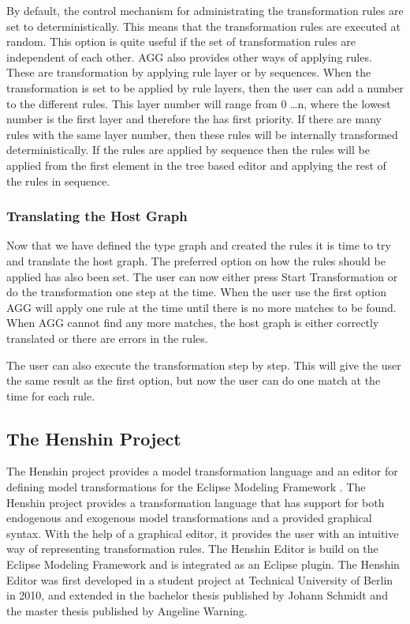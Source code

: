 By default, the control mechanism for administrating the transformation rules
are set to deterministically. This means that the transformation rules are
executed at random. This option is quite useful if the set of transformation
rules are independent of each other. AGG also provides other ways of applying
rules. These are transformation by applying rule layer or by sequences. When the
transformation is set to be applied by rule layers, then the user can add a
number to the different rules. This layer number will range from 0 \ldots n,
where the lowest number is the first layer and therefore the has first
priority. If there are many rules with the same layer number, then these rules
will be internally transformed deterministically. If the rules are applied
by sequence then the rules will be applied from the first element in the tree
based editor and applying the rest of the rules in sequence.

\subsubsection*{Translating the Host Graph}

Now that we have defined the type graph and created the rules it is time to try
and translate the host graph. The preferred option on how the rules should be
applied has also been set. The user can now either press Start Transformation or
do the transformation one step at the time. When the user use the first option
AGG will apply one rule at the time until there is no more matches to be found.
When AGG cannot find any more matches, the host graph is either correctly
translated or there are errors in the rules. 

The user can also execute the transformation step by step. This will give the
user the same result as the first option, but now the user can do one match at
the time for each rule. 

\subsection{The Henshin Project}

The Henshin project\cite{Henshin} provides a model transformation
language and an editor for defining model transformations for the Eclipse
Modeling Framework \cite{Steinberg2009}. The Henshin project provides a
transformation language that has support for both endogenous and exogenous
model transformations and a provided graphical syntax. With the help of a
graphical editor, it provides the user with an intuitive way of representing
transformation rules. The Henshin Editor is build on the Eclipse Modeling
Framework and is integrated as an Eclipse plugin. The Henshin Editor was first
developed in a student project at Technical University of Berlin in 2010, and
extended in the bachelor thesis \cite{JohannSchmidt} published by Johann Schmidt
and the master thesis \cite{AngelineWarning} published by Angeline Warning.

